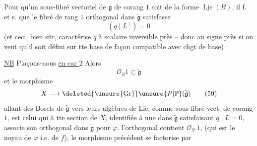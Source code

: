 Pour qu'un sous-fibré vectoriel  de $\mathfrak g$ de corang $1$ soit de la forme $\underline{\operatorname{Lie}}(B)$, il f. et s. que le fibré   de rang $1$ orthogonal  dans $\widetilde{\mathfrak g}$ satisfasse
\[
(q\mid L^\perp)=0
\]
(et ceci, bien sûr, caractérise $q$  à scalaire inversible près  -- donc au signe près si on veut qu'il soit défini sur tte base de façon compatible avec chgt de base)

 \uline{NB} Plaçons-nous \uline{en car $2$} Alors
\[
\mathcal O_S1\subset\widetilde{\mathfrak g}\tag*{(58)}
\]
et le  morphisme
\[
X\longrightarrow\deleted{\unsure{\mathrm{Gr}}}\unsure{P|\mathbb P}(\widetilde{\mathfrak g})\tag*{(59)}
\]
allant des Borels de $\widetilde{\mathfrak g}$ vers leurs algèbres de Lie,  comme sous fibré vect. de corang $1$, est celui qui à tte section de $X$, identifiée à une    dans $\widetilde{\mathfrak g}$ satisfaisant $q\mid L=0$, associe son orthogonal dans $\widetilde{\mathfrak g}$ pour $\varphi$.   l'orthogonal contient $\mathcal O_S.1$, (qui est le noyau de $\varphi$ \unsure{\}|,} i.e. de $f$),  le morphisme précédent se factorise par

